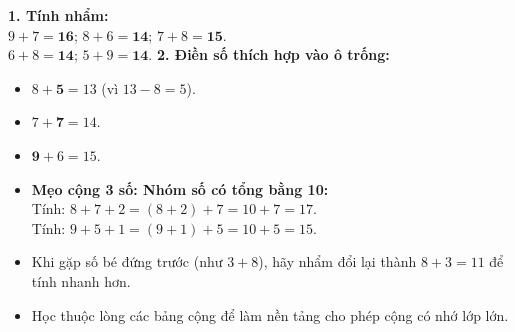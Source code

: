 \documentclass[11pt,a4paper]{article}
\begin{document}
\vspace{-1.5mm}
\noindent
\begin{minipage}[t]{0.49\textwidth}\vspace{0pt}
\begin{tcolorbox}[
  enhanced,
  colback=green!4!white,
  colframe=green!60!black,
  arc=2mm, boxrule=0.8pt,
  left=2mm, right=2mm, top=1.8mm, bottom=1.8mm,
  title={\footnotesize\bfseries\color{white}\faCheckCircle\ 4. Ví dụ thực hành chuẩn mực}
]
{\footnotesize
\textbf{1. Tính nhẩm:}\\
$9 + 7 = \mathbf{16}$; $8 + 6 = \mathbf{14}$; $7 + 8 = \mathbf{15}$.\\
$6 + 8 = \mathbf{14}$; $5 + 9 = \mathbf{14}$.
\textbf{2. Điền số thích hợp vào ô trống:}\\
\begin{itemize}\setlength{\itemsep}{0.5pt}\setlength{\leftskip}{-2.5mm}
  \item $8 + \mathbf{5} = 13$ (vì $13 - 8 = 5$).
  \item $7 + \mathbf{7} = 14$.
  \item $\mathbf{9} + 6 = 15$.
\end{itemize}
}
\end{tcolorbox}
\end{minipage}
\hfill
\begin{minipage}[t]{0.49\textwidth}\vspace{0pt}
\begin{tcolorbox}[
  enhanced,
  colback=red!4!white,
  colframe=red!75!black,
  arc=2mm, boxrule=0.8pt,
  left=2mm, right=2mm, top=1.8mm, bottom=1.8mm,
  title={\footnotesize\bfseries\color{white}\faExclamationTriangle\ 5. Mẹo tránh bẫy trắc nghiệm}
]
{\footnotesize
\begin{itemize}\setlength{\itemsep}{1pt}\setlength{\leftskip}{-2.5mm}
  \item \textbf{Mẹo cộng 3 số: Nhóm số có tổng bằng 10:}\\
  Tính: $8 + 7 + 2 = (8 + 2) + 7 = 10 + 7 = 17$.\\
  Tính: $9 + 5 + 1 = (9 + 1) + 5 = 10 + 5 = 15$.
  \item Khi gặp số bé đứng trước (như $3 + 8$), hãy nhẩm đổi lại thành $8 + 3 = 11$ để tính nhanh hơn.
  \item Học thuộc lòng các bảng cộng để làm nền tảng cho phép cộng có nhớ lớp lớn.
\end{itemize}
}
\end{tcolorbox}
\end{minipage}
\end{document}
